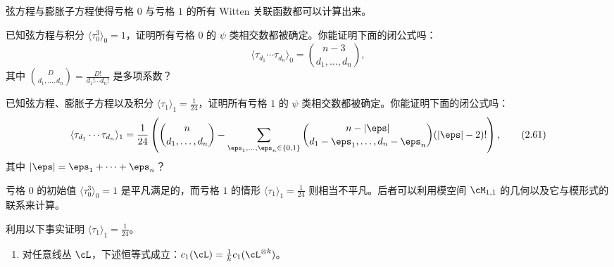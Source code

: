 弦方程与膨胀子方程使得亏格 $0$ 与亏格 $1$ 的所有 Witten 关联函数都可以计算出来。

\begin{exercise}[2.6]
已知弦方程与积分 $\langle\tau_0^3\rangle_0=1$，证明所有亏格 $0$ 的 $\psi$ 类相交数都被确定。你能证明下面的闭公式吗：
\begin{equation}
  \langle\tau_{d_1}\cdots\tau_{d_n}\rangle_0=\binom{n-3}{d_1,\dots,d_n},
  \tag{2.60}
\end{equation}
其中 $\binom{D}{d_1,\dots,d_n}=\frac{D!}{d_1!\cdots d_n!}$ 是多项系数？
\end{exercise}

\begin{exercise}[2.7]
已知弦方程、膨胀子方程以及积分 $\langle\tau_1\rangle_1=\frac{1}{24}$，证明所有亏格 $1$ 的 $\psi$ 类相交数都被确定。你能证明下面的闭公式吗：
\begin{equation}
  \langle\tau_{d_1}\cdots\tau_{d_n}\rangle_1=\frac{1}{24}\left(\binom{n}{d_1,\dots,d_n}-\sum_{\eps_1,\dots,\eps_n\in\{0,1\}}\binom{n-|\eps|}{d_1-\eps_1,\dots,d_n-\eps_n}(|\eps|-2)!\right),
  \tag{2.61}
\end{equation}
其中 $|\eps|=\eps_1+\cdots+\eps_n$？
\end{exercise}

亏格 $0$ 的初始值 $\langle\tau_0^3\rangle_0=1$ 是平凡满足的，而亏格 $1$ 的情形 $\langle\tau_1\rangle_1=\frac{1}{24}$ 则相当不平凡。后者可以利用模空间 $\cM_{1,1}$ 的几何以及它与模形式的联系来计算。

\begin{exercise}[2.8]
利用以下事实证明 $\langle\tau_1\rangle_1=\frac{1}{24}$。
\begin{enumerate}[label=(\arabic*)]
  \item 对任意线丛 $\cL$，下述恒等式成立：$c_1(\cL)=\frac{1}{k}c_1(\cL^{\otimes k})$。
\end{enumerate}
\end{exercise}

